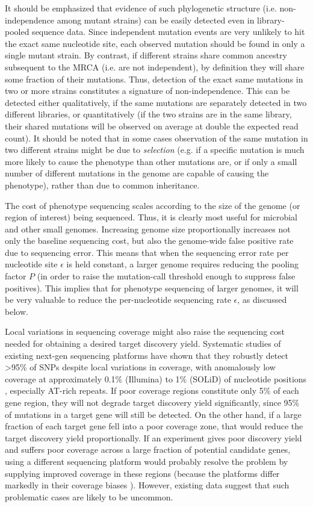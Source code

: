 \documentclass[letterpaper,10pt,english]{howto}
\begin{document}
It should be emphasized that evidence of such phylogenetic
structure (i.e. non-independence among mutant strains) can
be easily detected even in library-pooled sequence data.
Since independent mutation events are very unlikely to hit
the exact same nucleotide site, each observed mutation should
be found in only a single mutant strain.  By contrast, if
different strains share common ancestry subsequent to the
MRCA (i.e. are not independent), by definition they will share
some fraction of their mutations.  Thus, detection of the exact
same mutations in two or more strains constitutes a signature
of non-independence.  This can be detected either qualitatively,
if the same mutations are separately detected in two different
libraries, or quantitatively (if the two strains are in the
same library, their shared mutations will be observed on average at
double the expected read count).  It should be noted that
in some cases observation of the same mutation in two different
strains might be due to \emph{selection} (e.g. if a specific mutation
is much more likely to cause the phenotype than other mutations
are, or if only a small number of different mutations in the
genome are capable of causing the phenotype), rather than due to
common inheritance.

The cost of phenotype sequencing scales according to the
size of the genome (or region of interest) being sequenced.  Thus,
it is clearly most useful for microbial and other small genomes.  Increasing
genome size proportionally increases not only the baseline sequencing cost,
but also the genome-wide false positive rate
due to sequencing error.  This means that when the sequencing error rate
per nucleotide site $\epsilon$ is held constant, a larger
genome requires reducing the pooling factor $P$ (in order
to raise the mutation-call threshold enough to suppress false positives).
This implies that for phenotype sequencing of larger genomes, it
will be very valuable to reduce the per-nucleotide sequencing rate
$\epsilon$, as discussed below.

Local variations in sequencing coverage might also raise the
sequencing cost needed for obtaining a desired target discovery yield.
Systematic studies of existing next-gen sequencing platforms
have shown that they robustly detect \textgreater{}95\% of SNPs despite
local variations in coverage,
with anomalously low coverage at approximately 0.1\% (Illumina)
to 1\% (SOLiD) of nucleotide positions \cite{Harismendy2009} ,
especially AT-rich repeats.  If
poor coverage regions constitute only 5\% of each gene region,
they will not degrade target discovery yield significantly,
since 95\% of mutations in a target gene will still be detected.
On the other hand, if a large fraction of each target gene
fell into a poor coverage zone, that would reduce the target discovery
yield proportionally.  If an experiment gives poor discovery
yield and suffers poor coverage across a large fraction of
potential candidate genes, using a different sequencing platform
would probably resolve the problem by supplying improved
coverage in these regions (because the platforms differ
markedly in their coverage biases \cite{Harismendy2009} ).
However, existing data suggest that such problematic cases
are likely to be uncommon.
\end{document}
